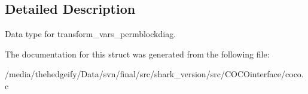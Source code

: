 \subsection{Detailed Description}
Data type for transform\+\_\+vars\+\_\+permblockdiag. 

The documentation for this struct was generated from the following file\+:\begin{DoxyCompactItemize}
\item 
/media/thehedgeify/\+Data/svn/final/src/shark\+\_\+version/src/\+C\+O\+C\+Ointerface/coco.\+c\end{DoxyCompactItemize}
